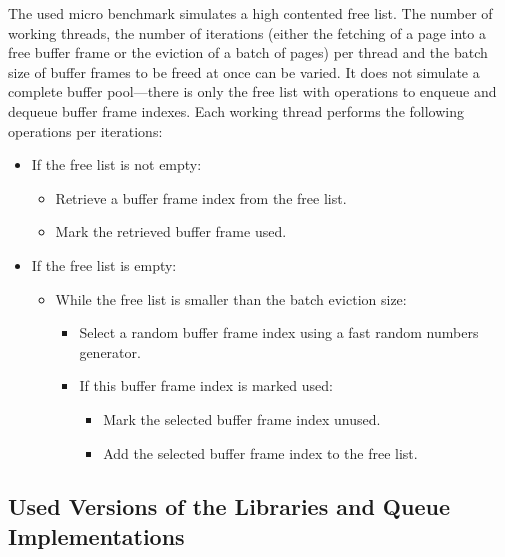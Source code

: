 	The used micro benchmark simulates a high contented free list. The number of working threads, the number of iterations (either the fetching of a page into a free buffer frame or the eviction of a batch of pages) per thread and the batch size of buffer frames to be freed at once can be varied. It does not simulate a complete buffer pool---there is only the free list with operations to enqueue and dequeue buffer frame indexes. Each working thread performs the following operations per iterations:
	
\begin{@empty}
	\begin{itemize}
		\itemsep0em
		\item	If the free list is not empty:
			\begin{itemize}
				\item	Retrieve a buffer frame index from the free list.
				\item Mark the retrieved buffer frame used.
			\end{itemize}
		\item	If the free list is empty:
			\begin{itemize}
				\item	While the free list is smaller than the batch eviction size:
					\begin{itemize}
						\item	Select a random buffer frame index using a fast random numbers generator.
						\item If this buffer frame index is marked used:
							\begin{itemize}
								\item	Mark the selected buffer frame index unused.
								\item	Add the selected buffer frame index to the free list.
							\end{itemize}
					\end{itemize}
			\end{itemize}
	\end{itemize}
\end{@empty}

\subsection[Queue Versions]{Used Versions of the Libraries and Queue Implementations}

